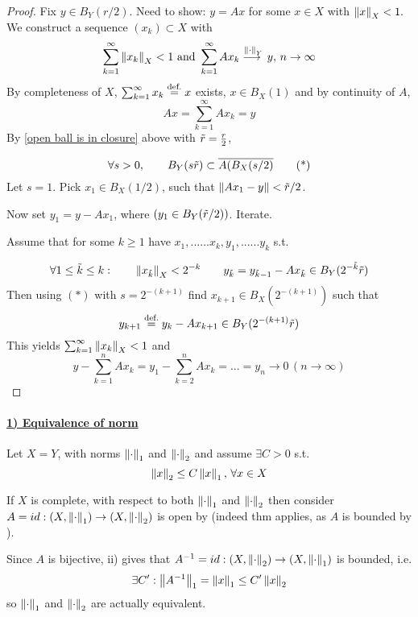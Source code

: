 \documentclass{article}
\begin{document}
\begin{proof}
Fix $y\in B_Y(r/2)$. Need to show: $y=Ax$ for some $x\in X$ with $\left\|{x}\right\|_X<1.$\\
We construct a sequence $(x_k)\subset X$ with 
$$
\sum_{k=1}^\infty \left\|{x_k}\right\|_X<1\,\,\text{and}\,\,\sum_{k=1}^\infty Ax_k\stackrel{\left\|{\cdot}\right\|_Y}{\longrightarrow{}}y,\,n\to\infty
$$
By completeness of $X$, $\sum_{k=1}^\infty x_k\stackrel{\text{def.}}{=} x$ exists, $x\in B_X(1)$ and by continuity of $A$,
$$Ax=\sum_{k=1}^\infty Ax_k=y$$
By \cref{open ball is in closure} above with $\Tilde{r}=\frac{r}{2}$,  

\begin{equation*}
    \forall s>0, \qquad B_Y(s\Tilde{r})\subset \overline{A(B_X(s/2)}
    \tag{*}
\end{equation*}
Let $s=1$. Pick $x_1\in B_X(1/2)$, such that $\left\|{Ax_1-y}\right\|<\Tilde{r}/2$. 

Now set $y_1=y-Ax_1$, where $(y_1 \in B_Y(\Tilde{r}/2))$. Iterate.  

Assume that for some $k \geq 1$ have $x_1,......x_k,y_1,......y_k$ s.t.

$$
\forall 1\leq\tilde{k}\leq k:\qquad \left\|{x_{\Tilde{k}}}\right\|_X < 2^{-k}\qquad y_{\tilde{k}}=y_{\tilde{k}-1}-Ax_{\tilde{k}}\in B_Y(2^{-\Tilde{k}}\Tilde{r})
$$
Then using $(*)$ with $s=2^{-(k+1)}$ find $x_{k+1}\in B_X(2^{-(k+1)})$ such that
$$
y_{k+1}\stackrel{\text{def.}}{=} y_k-Ax_{k+1}\in B_Y(2^{-(k+1)}\Tilde{r})
$$
This yields $\sum_{k=1}^{\infty}\left\|{x_k}\right\|_X<1$ and 
$$
y-\sum_{k=1}^n Ax_k=y_1-\sum_{k=2}^n Ax_k=...=y_n\to0\,(n\to \infty)
$$
\end{proof}

\paragraph{\underline{\textbf{1) Equivalence of norm}}}

\begin{example}\nl
Let $X=Y$, with norms $\left\|{\cdot}\right\|_1$ and $\left\|{\cdot}\right\|_2$ and assume $\exists C>0$ s.t.
\begin{equation}
\label{equivalence of norm example}
    \left\|{x}\right\|_2\leq C\left\|{x}\right\|_1,\,\forall x\in X
\end{equation}

If $X$ is complete, with respect to both $\left\|{\cdot}\right\|_1$ and $\left\|{\cdot}\right\|_2$ then consider $A=id:(X,\left\|{\cdot}\right\|_1)\to(X,\left\|{\cdot}\right\|_2)$ is open by  (indeed thm applies, as $A$ is bounded by ). 

Since $A$ is bijective, ii) gives that $A^{-1}=id:(X,\left\|{\cdot}\right\|_2)\to(X,\left\|{\cdot}\right\|_1)$ is bounded, i.e.
$$
\exists C': \left\|{A^{-1}}\right\|_1=\left\|{x}\right\|_1\leq C'\left\|{x}\right\|_2
$$
so $\left\|{\cdot}\right\|_1$ and $\left\|{\cdot}\right\|_2$ are actually equivalent.
\end{example}
\end{document}
